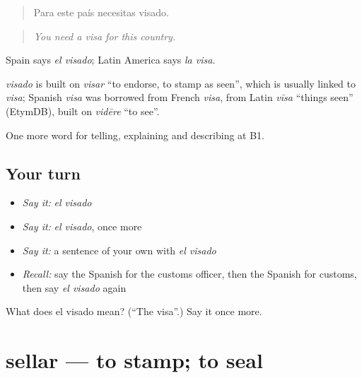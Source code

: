 \begin{quote}
Para este país necesitas visado.
\end{quote}

\begin{quote}
\emph{You need a visa for this country.}
\end{quote}

Spain says \emph{el visado}; Latin America says \emph{la visa}.

\begin{cousinweb}
\emph{visado} is built on \emph{visar} \textquotedblleft{}to endorse, to stamp as seen\textquotedblright{}, which is usually linked to \emph{visa}; Spanish \emph{visa} was borrowed from French \emph{visa}, from Latin \emph{vīsa} \textquotedblleft{}things seen\textquotedblright{} (EtymDB), built on \emph{vidēre} \textquotedblleft{}to see\textquotedblright{}.
\end{cousinweb}

\begin{grammarlens}[title={What you've built}]
One more word for telling, explaining and describing at B1.
\end{grammarlens}

\subsection*{Your turn}
\begin{itemize}
\raggedright
  \item \emph{Say it:} \emph{el visado}
  \item \emph{Say it:} \emph{el visado}, once more
  \item \emph{Say it:} a sentence of your own with \emph{el visado}
  \item \emph{Recall:} say the Spanish for the customs officer, then the Spanish for customs, then say \emph{el visado} again
\end{itemize}

\begin{tcolorbox}[breakable,colback=teal!4,colframe=teal!35!black,title={Before you move on}]
What does el visado mean? (\textquotedblleft{}The visa\textquotedblright{}.) Say it once more.
\end{tcolorbox}
\section[sellar]{sellar — to stamp; to seal}

\label{lesson:ES-C656-sellar}



